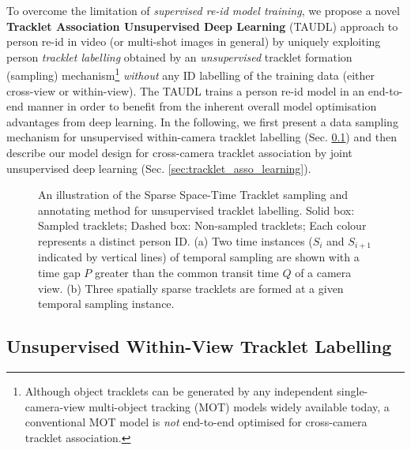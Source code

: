 \documentclass[runningheads]{llncs}
\begin{document}
To overcome the limitation of {\em supervised re-id model training}, 
we propose a novel {\bf Tracklet Association Unsupervised Deep Learning} 
(TAUDL)
approach to person re-id in video (or multi-shot images in general) by
uniquely exploiting person {\em tracklet labelling} obtained by an {\em
  unsupervised} tracklet formation (sampling)
mechanism\footnote{Although object tracklets can be generated by any
  independent single-camera-view multi-object tracking (MOT) models widely
  available today, a conventional MOT model is {\em not} end-to-end optimised for
  cross-camera tracklet association.} {\em without}
any ID labelling of the training data (either cross-view or within-view).
The TAUDL trains a person re-id model in an end-to-end manner in order to
benefit from the inherent overall model optimisation advantages from deep learning.
In the following, we first present a data sampling mechanism for unsupervised
within-camera tracklet labelling (Sec. \ref{sec:tracklet_labelling})
and then describe our model design for cross-camera tracklet association
by joint unsupervised deep learning (Sec. \ref{sec:tracklet_asso_learning}).

\begin{figure}
	\centering
	\caption{An illustration of the Sparse Space-Time Tracklet sampling and annotating method
		for unsupervised tracklet labelling.
		Solid box: Sampled tracklets;
		Dashed box: Non-sampled tracklets;
		Each colour represents a distinct person ID.
		(a) Two time instances ($S_i$ and $S_{i+1}$
                indicated by vertical lines) of temporal sampling are shown
		with a time gap $P$ greater than the common transit time $Q$ of a camera view. 
		(b) Three spatially sparse tracklets are formed at a
                given temporal sampling instance.
	}
	\label{fig:tracklet_labelling}
\end{figure}





\subsection{Unsupervised Within-View Tracklet Labelling}
\label{sec:tracklet_labelling}
\end{document}

